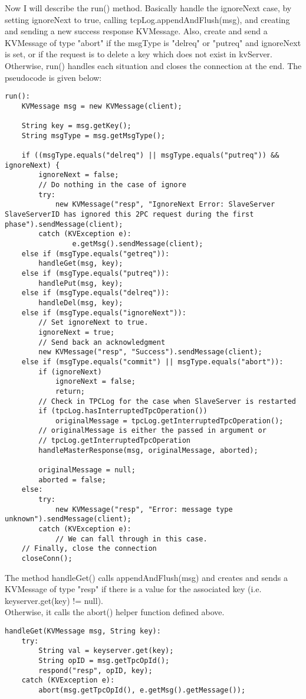 \documentclass{article}
\begin{document}
Now I will describe the run() method. Basically handle the ignoreNext case, by setting ignoreNext to true, calling
tcpLog.appendAndFlush(msg), and creating and sending a new success response KVMessage.
Also, create and send a KVMessage of type "abort" if the msgType is "delreq" or "putreq" and ignoreNext is set, or if
the request is to delete a key which does not exist in kvServer. Otherwise, run() handles each situation and closes the
connection at the end. The pseudocode is given below:
\begin{verbatim}
run():
    KVMessage msg = new KVMessage(client);

    String key = msg.getKey();
    String msgType = msg.getMsgType();

    if ((msgType.equals("delreq") || msgType.equals("putreq")) && ignoreNext) {
        ignoreNext = false;
        // Do nothing in the case of ignore
        try:
            new KVMessage("resp", "IgnoreNext Error: SlaveServer SlaveServerID has ignored this 2PC request during the first phase").sendMessage(client);
        catch (KVException e):
                e.getMsg().sendMessage(client);
    else if (msgType.equals("getreq")):
        handleGet(msg, key);
    else if (msgType.equals("putreq")):
        handlePut(msg, key);
    else if (msgType.equals("delreq")):
        handleDel(msg, key);
    else if (msgType.equals("ignoreNext")):
        // Set ignoreNext to true.
        ignoreNext = true;
        // Send back an acknowledgment
        new KVMessage("resp", "Success").sendMessage(client);
    else if (msgType.equals("commit") || msgType.equals("abort")):
        if (ignoreNext)
            ignoreNext = false;
            return;
        // Check in TPCLog for the case when SlaveServer is restarted
        if (tpcLog.hasInterruptedTpcOperation())
            originalMessage = tpcLog.getInterruptedTpcOperation();
        // originalMessage is either the passed in argument or
        // tpcLog.getInterruptedTpcOperation
        handleMasterResponse(msg, originalMessage, aborted);

        originalMessage = null;
        aborted = false;
    else:
        try:
            new KVMessage("resp", "Error: message type unknown").sendMessage(client);
        catch (KVException e):
            // We can fall through in this case.
    // Finally, close the connection
    closeConn();
\end{verbatim}

The method handleGet() calls appendAndFlush(msg) and creates and sends a KVMessage of type "resp" if there is a value for the associated key (i.e. keyserver.get(key) != null).\\
Otherwise, it calls the abort() helper function defined above.
\begin{verbatim}
handleGet(KVMessage msg, String key):
    try:
        String val = keyserver.get(key);
        String opID = msg.getTpcOpId();
        respond("resp", opID, key);
    catch (KVException e):
        abort(msg.getTpcOpId(), e.getMsg().getMessage());
\end{verbatim}
\end{document}
